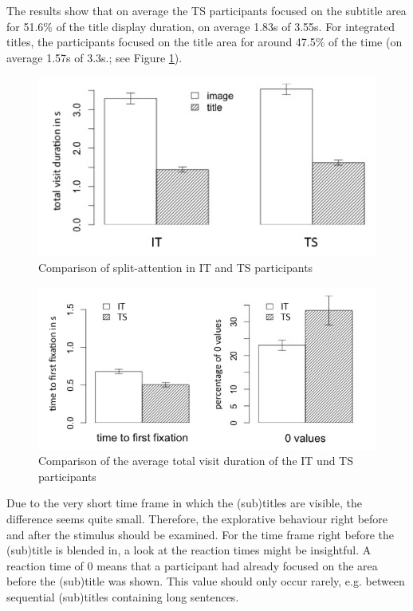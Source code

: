 \documentclass[output=paper]{langsci/langscibook}
\begin{document}
The results show that on average the TS participants focused on the subtitle area for 51.6\% of the title display duration, on average 1.83s of 3.55s. For integrated titles, the participants focused on the title area for around 47.5\% of the time (on average 1.57s of 3.3s.; see Figure \ref{fox:fig:7}).


\begin{figure} 
  \includegraphics[height=.3\textheight]{figures/Fox7.png}
  \caption{Comparison of split-attention in IT and TS participants}
  \label{fox:fig:7}
\end{figure}

\begin{figure} 
  \includegraphics[height=.3\textheight]{figures/Fox8.png}
  \caption{Comparison of the average total visit duration of the IT und TS participants}
  \label{fox:fig:8}
\end{figure}


Due to the very short time frame in which the (sub)titles are visible, the difference seems quite small. Therefore, the explorative behaviour right before and after the stimulus should be examined. For the time frame right before the (sub)title is blended in, a look at the reaction times might be insightful. A reaction time of 0 means that a participant had already focused on the area before the (sub)title was shown. This value should only occur rarely, e.g. between sequential (sub)titles containing long sentences.
\end{document}
